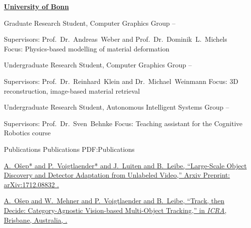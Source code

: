 \documentclass[letterpaper,MMMyyyy,nonstopmode]{simpleresumecv}
\begin{document}
\begin{Body}
\Gap
\Entry
\href{https://www.uni-bonn.de/}
{\textbf{University of Bonn}}

\Gap
\BulletItem
Graduate Research Student, Computer Graphics Group
\hfill
{} --
\begin{Detail}
\SubBulletItem
Supervisors:
Prof.~Dr.~Andreas~Weber and
Prof.~Dr.~Dominik~L.~Michels
\SubBulletItem
Focus:
Physics-based modelling of material deformation
\end{Detail}

\Gap
\BulletItem
Undergraduate Research Student, Computer Graphics Group
\hfill
{} --
\begin{Detail}
\SubBulletItem
Supervisors:
Prof.~Dr.~Reinhard~Klein and
Dr.~Michael~Weinmann
\SubBulletItem
Focus:
3D reconstruction, image-based material retrieval
\end{Detail}

\Gap
\BulletItem
Undergraduate Research Student, Autonomous Intelligent Systems Group
\hfill
{} --
\begin{Detail}
\SubBulletItem
Supervisors:
Prof.~Dr.~Sven~Behnke
\SubBulletItem
Focus:
Teaching assistant for the Cognitive Robotics course 
\end{Detail}


\Section
{Publications}
{Publications}
{PDF:Publications}

%
%
%
\begingroup

\Gap
\href{https://arxiv.org/abs/1712.08832}
{\underline{A.~O\v{s}ep}* and P.~Voigtlaender* and J.~Luiten and B.~Leibe,
``Large-Scale Object Discovery and Detector Adaptation from Unlabeled Video,''
Arxiv Preprint:	arXiv:1712.08832 
.}

\Gap
\href{https://arxiv.org/pdf/1712.07920.pdf}
{\underline{A.~Ošep} and W.~Mehner and P.~Voigtlaender and B.~Leibe,
``Track, then Decide: Category-Agnostic Vision-based Multi-Object Tracking,''
in \textit{ICRA},
Brisbane, Australia,
.}


\end{Body}
\end{document}
